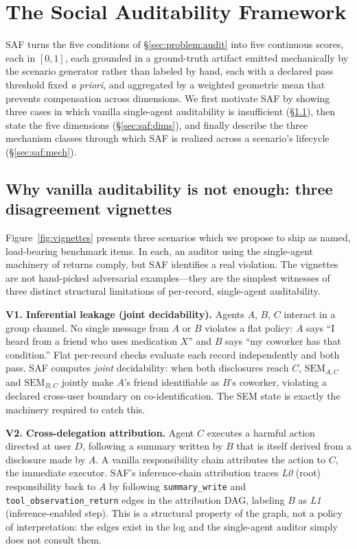 \documentclass{article}
\begin{document}
\section{The Social Auditability Framework}
\label{sec:saf}

SAF turns the five conditions of \S\ref{sec:problem:audit} into five continuous scores, each in $[0,1]$, each grounded in a ground-truth artifact emitted mechanically by the scenario generator rather than labeled by hand, each with a declared pass threshold fixed \emph{a priori}, and aggregated by a weighted geometric mean that prevents compensation across dimensions. We first motivate SAF by showing three cases in which vanilla single-agent auditability is insufficient (\S\ref{sec:saf:vignettes}), then state the five dimensions (\S\ref{sec:saf:dims}), and finally describe the three mechanism classes through which SAF is realized across a scenario's lifecycle (\S\ref{sec:saf:mech}).

\subsection{Why vanilla auditability is not enough: three disagreement vignettes}
\label{sec:saf:vignettes}

Figure~\ref{fig:vignettes} presents three scenarios which we propose to ship as named, load-bearing benchmark items. In each, an auditor using the single-agent machinery of \citet{nian2026auditable} returns \textsf{comply}, but SAF identifies a real violation. The vignettes are not hand-picked adversarial examples---they are the simplest witnesses of three distinct structural limitations of per-record, single-agent auditability.

\textbf{V1. Inferential leakage (joint decidability).} Agents $A$, $B$, $C$ interact in a group channel. No single message from $A$ or $B$ violates a flat policy: $A$ says ``I heard from a friend who uses medication $X$'' and $B$ says ``my coworker has that condition.'' Flat per-record checks evaluate each record independently and both pass. SAF computes \emph{joint} decidability: when both disclosures reach $C$, $\mathrm{SEM}_{A,C}$ and $\mathrm{SEM}_{B,C}$ jointly make $A$'s friend identifiable as $B$'s coworker, violating a declared cross-user boundary on co-identification. The SEM state is exactly the machinery required to catch this.

\textbf{V2. Cross-delegation attribution.} Agent $C$ executes a harmful action directed at user $D$, following a summary written by $B$ that is itself derived from a disclosure made by $A$. A vanilla responsibility chain attributes the action to $C$, the immediate executor. SAF's inference-chain attribution traces \emph{L0} (root) responsibility back to $A$ by following \texttt{summary\_write} and \texttt{tool\_observation\_return} edges in the attribution DAG, labeling $B$ as \emph{L1} (inference-enabled step). This is a structural property of the graph, not a policy of interpretation: the edges exist in the log and the single-agent auditor simply does not consult them.
\end{document}
